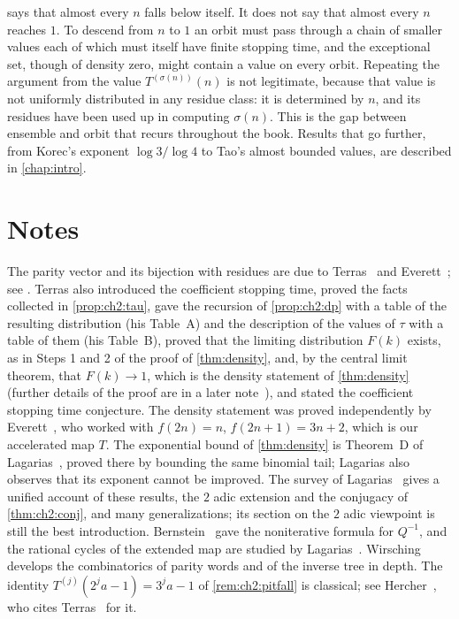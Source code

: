 \begin{remark}\label{rem:ch2:notenough}
 says that almost every $n$ falls below itself. It does not
say that almost every $n$ reaches $1$. To descend from $n$ to $1$ an orbit
must pass through a chain of smaller values each of which must itself have
finite stopping time, and the exceptional set, though of density zero, might
contain a value on every orbit. Repeating the argument from the value
$T^{(\sigma(n))}(n)$ is not legitimate, because that value is not uniformly
distributed in any residue class: it is determined by $n$, and its residues
have been used up in computing $\sigma(n)$. This is the gap between ensemble
and orbit that recurs throughout the book. Results that go further, from
Korec's exponent $\log3/\log4$ to Tao's almost bounded values, are described
in \cref{chap:intro}.
\end{remark}

\section*{Notes}

The parity vector and its bijection with residues are due to
Terras~\cite{terras1976} and Everett~\cite{everett1977}; see \cite[Theorem~B]{lagarias1985}.
Terras also introduced the coefficient stopping time, proved the facts collected in \cref{prop:ch2:tau}, gave the recursion of \cref{prop:ch2:dp} with a table of the resulting distribution (his Table~A) and the description of the values of $\tau$ with a table of them (his Table~B), proved that the limiting distribution $F(k)$ exists, as in Steps 1 and 2 of the proof of \cref{thm:density}, and, by the central limit theorem, that $F(k)\to1$, which is the density statement of \cref{thm:density} (further details of the proof are in a later note~\cite{terras1979}), and stated the coefficient stopping time conjecture.
The density
statement was proved independently by Everett~\cite{everett1977}, who worked
with $f(2n)=n$, $f(2n+1)=3n+2$, which is our accelerated map $T$.
The exponential bound of \cref{thm:density} is Theorem~D of Lagarias~\cite{lagarias1985}, proved there by bounding the same binomial tail; Lagarias also observes that its exponent cannot be improved.
The survey of
Lagarias~\cite{lagarias1985} gives a unified account of these results, the
$2$ adic extension and the conjugacy of \cref{thm:ch2:conj}, and many
generalizations; its section on the $2$ adic viewpoint is still the best
introduction. Bernstein~\cite{bernstein1994} gave the noniterative formula
for $Q^{-1}$, and the rational cycles of the extended map are studied by
Lagarias~\cite{lagarias1990}. Wirsching~\cite{wirsching1998} develops the
combinatorics of parity words and of the inverse tree in depth.
The identity $T^{(j)}(2^ja-1)=3^ja-1$ of \cref{rem:ch2:pitfall} is classical; see
Hercher~\cite[Lemma~8]{hercher2023}, who cites Terras~\cite{terras1976} for it.

